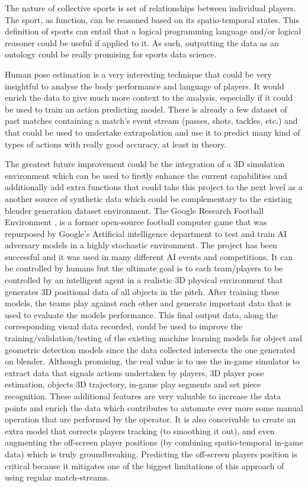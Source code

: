 \documentclass[
    11pt,
    oneside
]{report}
\begin{document}
The nature of collective sports is set of relationships between individual players. The sport, as function, can be reasoned based on its spatio-temporal states. This definition of sports can entail that a logical programming language and/or logical reasoner could be useful if applied to it. As such, outputting the data as an ontology could be really promising for sports data science.


Human pose estimation is a very interesting technique that could be very insightful to analyse the body performance and language of players. It would enrich the data to give much more context to the analysis, especially if it could be used to train an action predicting model. There is already a few dataset of past matches containing a match's event stream (passes, shots, tackles, etc.) and that could be used to undertake extrapolation and use it to predict many kind of types of actions with really good accuracy, at least in theory.


The greatest future improvement could be the integration of a 3D simulation environment which can be used to firstly enhance the current capabilities and additionally add extra functions that could take this project to the next level as a another source of synthetic data which could be complementary to the existing blender generation dataset environment. The Google Research Football Environment \cite{gfootball_env}, is a former open-source football computer game that was repurposed by Google's Artificial intelligence department to test and train AI adversary models in a highly stochastic environment. The project has been successful and it was used in many different AI events and competitions. It can be controlled by humans but the ultimate goal is to each team/players to be controlled by an intelligent agent in a realistic 3D physical environment that generates 3D positional data of all objects in the pitch. After training these models, the teams play against each other and generate important data that is used to evaluate the models performance. This final output data, along the corresponding visual data recorded, could be used to improve the training/validation/testing of the existing machine learning models for object and geometric detection models since the data collected intersects the one generated on blender. Although promising, the real value is to use the in-game simulator to extract data that signals actions undertaken by players, 3D player pose estimation, objects 3D trajectory, in-game play segments and set piece recognition. These additional features are very valuable to increase the data points and enrich the data which contributes to automate ever more some manual operation that are performed by the operator. It is also conceivable to create an extra model that corrects players tracking (to smoothing it out), and even augmenting the off-screen player positions (by combining spatio-temporal in-game data) which is truly groundbreaking. Predicting the off-screen players position is critical because it mitigates one of the biggest limitations of this approach of using regular match-streams.
\end{document}
